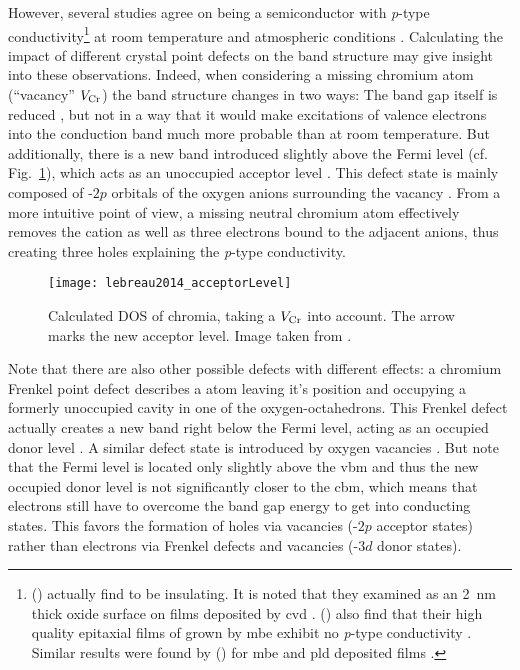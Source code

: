 However, several studies agree on  being a semiconductor with \textit{p}-type conductivity\footnote{
    \citeauthor{cheng2001a} (\citeyear{cheng2001a}) actually find  to be insulating. It is noted that they examined  as an \qty{2}{\nm} thick oxide surface on  films deposited by \gls{cvd} \cite{cheng2001a}.
    \citeauthor{farrell2015} (\citeyear{farrell2015}) also find that their high quality epitaxial films of  grown by \gls{mbe} exhibit no \textit{p}-type conductivity \cite{farrell2015}.
    Similar results were found by \citeauthor{kehoe2016} (\citeyear{kehoe2016}) for \gls{mbe} and \gls{pld} deposited films \cite{kehoe2016}.
}
at room temperature and atmospheric conditions
    \cite{kofstad1980,cheng1996,caricato2010,lebreau2014,mi2018,singh2019,polyakov2022a}.
Calculating the impact of different crystal point defects on the band structure may give insight into these observations.
Indeed, when considering a missing chromium atom (\enquote{vacancy} $V_{\ce{Cr}}$) the band structure changes in two ways:
The band gap itself is reduced \cite{mi2018}, but not in a way that it would make excitations of valence electrons into the conduction band much more probable than at room temperature.
But additionally, there is a new band introduced slightly above the Fermi level (cf. Fig.~\ref{Fig:lebreau2014_acceptorLevel}), which acts as an unoccupied acceptor level
    \cite{mi2018}.
This defect state is mainly composed of -$2p$ orbitals of the oxygen anions surrounding the vacancy
    \cite{lebreau2014}.
From a more intuitive point of view, a missing neutral chromium atom effectively removes the  cation as well as three electrons bound to the adjacent  anions, thus creating three holes \cite{lebreau2014} explaining the \textit{p}-type conductivity.
\begin{figure}
    \centering
    \texttt{[image: lebreau2014\_acceptorLevel]}
    \caption{Calculated \acrfull{DOS} of chromia, taking a $V_{\ce{Cr}}$ into account.
    The arrow marks the new acceptor level.
    Image taken from \cite{lebreau2014}.}
    \label{Fig:lebreau2014_acceptorLevel}
\end{figure}

Note that there are also other possible defects with different effects:
a chromium Frenkel point defect describes a  atom leaving it's position and occupying a formerly unoccupied cavity in one of the oxygen-octahedrons.
This Frenkel defect actually creates a new band right below the Fermi level, acting as an occupied donor level
    \cite{lebreau2014}.
A similar defect state is introduced by oxygen vacancies
    \cite{mi2018}.
But note that the Fermi level is located only slightly above the \gls{vbm} and thus the new occupied donor level is not significantly closer to the \gls{cbm}, which means that electrons still have to overcome the band gap energy to get into conducting states.
This favors the formation of holes via  vacancies (-$2p$ acceptor states) rather than electrons via  Frenkel defects and  vacancies (-$3d$ donor states).

